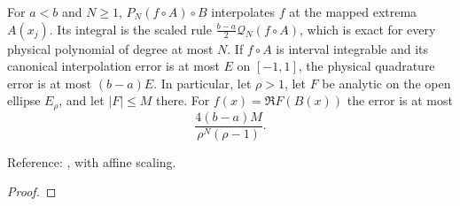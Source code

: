 \begin{theorem}
\label{thm:affine-chebyshev-quadrature}
\leanok
For $a<b$ and $N\ge1$, $P_N(f\circ A)\circ B$ interpolates $f$ at the mapped
extrema $A(x_j)$. Its integral is the scaled rule
$\frac{b-a}{2}\mathcal Q_N(f\circ A)$, which is exact for every physical
polynomial of degree at most $N$.
If $f\circ A$ is interval integrable and its canonical interpolation error is
at most $E$ on $[-1,1]$, the physical quadrature error is at most $(b-a)E$.
In particular, let $\rho>1$, let $F$ be analytic on the open ellipse $E_\rho$,
and let $|F|\le M$ there. For $f(x)=\Re F(B(x))$ the error is at most
\[
 \frac{4(b-a)M}{\rho^N(\rho-1)}.
\]

Reference: \cite[Chapters 8 and 19]{atap}, with affine scaling.
\end{theorem}
\begin{proof}
\leanok
\end{proof}

